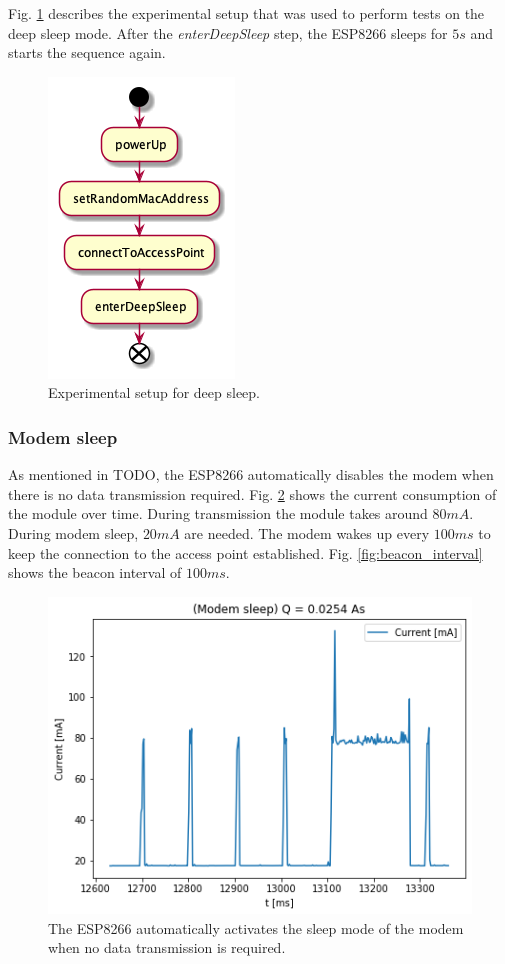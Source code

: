 Fig. \ref{fig:experiment_deep_sleep} describes the experimental setup that was used to perform tests on the deep sleep mode.
After the \textit{enterDeepSleep} step, the ESP8266 sleeps for $5s$ and starts the sequence again.
\begin{figure}[h]
    \centering
    \includegraphics[width = 0.35 \linewidth]{fig/sequence_deep_sleep.png}
    \caption{Experimental setup for deep sleep.}
    \label{fig:experiment_deep_sleep}
\end{figure}

\subsubsection{Modem sleep}
As mentioned in TODO, the ESP8266 automatically disables the modem when there is no data transmission required.
Fig. \ref{fig:modem_sleep} shows the current consumption of the module over time.
During transmission the module takes around $80mA$. During modem sleep, $20mA$ are needed.
The modem wakes up every $100ms$ to keep the connection to the access point established.
Fig. \ref{fig:beacon_interval} shows the beacon interval of $100ms$.

\begin{figure}[h]
    \includegraphics[width = \linewidth]{fig/modem_sleep.png}
    \caption{The ESP8266 automatically activates the sleep mode of the modem when no data transmission is required.}
    \label{fig:modem_sleep}
\end{figure}

